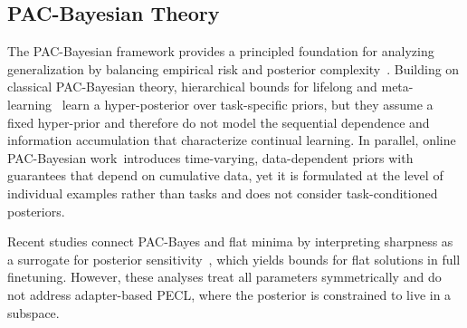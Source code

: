 \documentclass{article}
\theoremstyle{plain}
\theoremstyle{definition}
\theoremstyle{remark}
\begin{document}
\subsection{PAC-Bayesian Theory }


The PAC-Bayesian framework provides a principled foundation for analyzing generalization by balancing empirical risk and posterior complexity~\cite{mcallesterPACBayesianStochasticModel2003,pentinaPACBayesianBoundLifelong2014,germainPACBayesianTheoryMeets2016,lotfiPACBayesCompressionBounds2022}.
Building on classical PAC-Bayesian theory, hierarchical bounds for lifelong and meta-learning~\citep{pentinaPACBayesianBoundLifelong2014,JMLR:v24:22-1254} learn a hyper-posterior over task-specific priors, but they assume a fixed hyper-prior and therefore do not model the sequential dependence and information accumulation that characterize continual learning. In parallel, online PAC-Bayesian work~\citep{NEURIPS2022_onlineBayes,NEURIPS2024_xinrui}introduces time-varying, data-dependent priors with guarantees that depend on cumulative data, yet it is formulated at the level of individual examples rather than tasks and does not consider task-conditioned posteriors.


Recent studies connect PAC-Bayes and flat minima by interpreting sharpness as a surrogate for posterior sensitivity~\citep{NIPS2017_10ce03a1,jiang2019fantasticgeneralizationmeasures,mllenhoff2023sam}, which yields bounds for flat solutions in full finetuning. However, these analyses treat all parameters symmetrically and do not address adapter-based PECL, where the posterior is constrained to live in a subspace.
\end{document}
